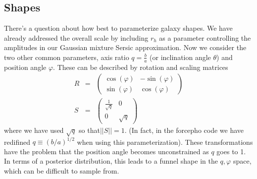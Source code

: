 \documentclass[modern]{aastex62}
\renewcommand{\det}[1]{||{#1}||}
\begin{document}
\subsection{Shapes}
There's a question about how best to parameterize galaxy shapes.
We have already addressed the overall scale by including $r_h$ as a parameter controlling the amplitudes in our Gaussian mixture Sersic approximation.
Now we consider the two other common parameters, axis ratio $q=\frac{b}{a}$ (or inclination angle $\theta$) and position angle $\varphi$.
These can be described by rotation and scaling matrices
\begin{eqnarray}
R & = & \begin{pmatrix} \cos (\varphi) & -\sin(\varphi)\\ \sin(\varphi) & \cos(\varphi)\end{pmatrix} \\
S & = & \begin{pmatrix} \frac{1}{\sqrt{q}} & 0 \\ 0 & \sqrt{q}\end{pmatrix}
\end{eqnarray}
where we have used $\sqrt{q}$ so that$\det{S}=1$.
(In fact, in the forcepho code we have redifined $q\equiv (b/a)^{1/2}$ when using this parameterization).
These transformations have the problem that the position angle becomes unconstrained as $q$ goes to 1.
In terms of a posterior distribution, this leads to a funnel shape in the $q, \varphi$ space, which can be difficult to sample from.
\end{document}
